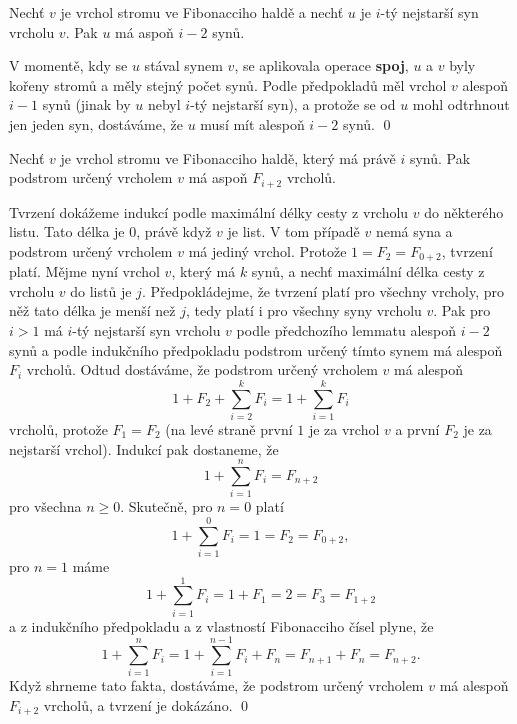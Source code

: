 \documentclass[a4paper,12pt]{article}
\begin{document}
\begin{lemma}Nechť $v$ je vrchol stromu ve 
Fibonacciho haldě a nechť $u$ je $i$-tý nejstarší syn 
vrcholu $v$. Pak $u$ má aspoň $i-2$ synů.
\end{lemma}

V momentě, kdy se $u$ stával synem $v$, se 
aplikovala operace {\bf spoj}, $u$ a $v$ byly kořeny 
stromů a měly stejný počet synů. 
Podle předpokladů měl vrchol $v$ alespoň $i-1$ 
synů (jinak by $u$ nebyl $i$-tý nejstarší syn), a 
protože se od $u$ mohl odtrhnout jen jeden syn, 
dostáváme, že $u$ musí mít alespoň $i-2$ synů. \qed
\enddemo

\begin{tvrzeni}Nechť $v$ je vrchol stromu ve 
Fibonacciho haldě, kte\-rý má právě $i$ synů. Pak 
podstrom určený vrcholem $v$ má aspoň $F_{i+2}$ 
vrcholů.
\end{tvrzeni}

Tvrzení dokážeme indukcí 
podle maximální délky cesty z vrcholu $v$ do některého 
listu.  Tato délka je $0$, právě když $v$ je list.  V tom 
případě $v$ nemá syna a podstrom určený vrcholem $
v$ má 
jediný vrchol.  Protože $1=F_2=F_{0+2}$, tvrzení platí.  
Mějme nyní vrchol $v$, který má $k$ 
synů, a nechť maximální délka cesty z vrcholu $
v$ do 
listů je $j$. Předpokládej\-me, že tvrzení platí pro 
všechny vrcholy, pro něž tato délka  
je menší než $j$,  tedy platí i pro 
všechny syny vrcholu $v$.  Pak pro $i>1$ má $i$-tý nejstarší 
syn vrcholu $v$ podle předchozího lemmatu alespoň $i-2$ 
synů a podle indukčního předpokladu podstrom určený 
tímto synem má alespoň $F_i$ vrcholů.  Odtud 
dostáváme, že podstrom určený vrcholem $v$ má alespoň 
$$1+F_2+\sum_{i=2}^kF_i=1+\sum_{i=1}^kF_i$$
vrcholů, protože $F_1=F_2$ (na levé straně první $
1$ 
je za vrchol $v$ a 
první $F_2$ je za nejstarší vrchol). Indukcí pak dostaneme, že 
$$1+\sum_{i=1}^nF_i=F_{n+2}$$
pro všechna $n\ge 0$. Skutečně, pro $n=0$ platí 
$$1+\sum_{i=1}^0F_i=1=F_2=F_{0+2},$$
pro $n=1$ máme 
$$1+\sum_{i=1}^1F_i=1+F_1=2=F_3=F_{1+2}$$
a z indukčního předpokladu a z vlastností Fibonacciho 
čísel plyne, že 
$$1+\sum_{i=1}^nF_i=1+\sum_{i=1}^{n-1}F_i+F_n=F_{n+1}+F_n=F_{n+2}
.$$
Když shrneme tato fakta, dostáváme, že podstrom 
určený vrcholem $v$ má alespoň $F_{i+2}$ vrcholů, a 
tvrzení je dokázáno. \qed
\enddemo
\end{document}
